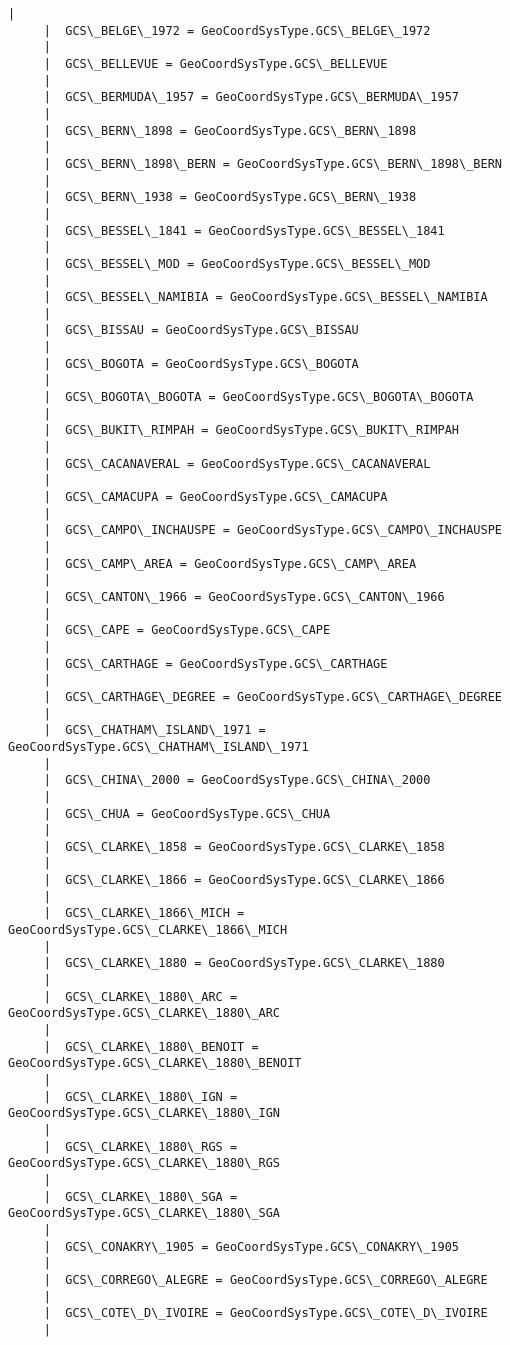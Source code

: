 \documentclass[11pt]{article}
\begin{document}
\begin{Verbatim}[commandchars=\\\{\}]
     |  
     |  GCS\_BELGE\_1972 = GeoCoordSysType.GCS\_BELGE\_1972
     |  
     |  GCS\_BELLEVUE = GeoCoordSysType.GCS\_BELLEVUE
     |  
     |  GCS\_BERMUDA\_1957 = GeoCoordSysType.GCS\_BERMUDA\_1957
     |  
     |  GCS\_BERN\_1898 = GeoCoordSysType.GCS\_BERN\_1898
     |  
     |  GCS\_BERN\_1898\_BERN = GeoCoordSysType.GCS\_BERN\_1898\_BERN
     |  
     |  GCS\_BERN\_1938 = GeoCoordSysType.GCS\_BERN\_1938
     |  
     |  GCS\_BESSEL\_1841 = GeoCoordSysType.GCS\_BESSEL\_1841
     |  
     |  GCS\_BESSEL\_MOD = GeoCoordSysType.GCS\_BESSEL\_MOD
     |  
     |  GCS\_BESSEL\_NAMIBIA = GeoCoordSysType.GCS\_BESSEL\_NAMIBIA
     |  
     |  GCS\_BISSAU = GeoCoordSysType.GCS\_BISSAU
     |  
     |  GCS\_BOGOTA = GeoCoordSysType.GCS\_BOGOTA
     |  
     |  GCS\_BOGOTA\_BOGOTA = GeoCoordSysType.GCS\_BOGOTA\_BOGOTA
     |  
     |  GCS\_BUKIT\_RIMPAH = GeoCoordSysType.GCS\_BUKIT\_RIMPAH
     |  
     |  GCS\_CACANAVERAL = GeoCoordSysType.GCS\_CACANAVERAL
     |  
     |  GCS\_CAMACUPA = GeoCoordSysType.GCS\_CAMACUPA
     |  
     |  GCS\_CAMPO\_INCHAUSPE = GeoCoordSysType.GCS\_CAMPO\_INCHAUSPE
     |  
     |  GCS\_CAMP\_AREA = GeoCoordSysType.GCS\_CAMP\_AREA
     |  
     |  GCS\_CANTON\_1966 = GeoCoordSysType.GCS\_CANTON\_1966
     |  
     |  GCS\_CAPE = GeoCoordSysType.GCS\_CAPE
     |  
     |  GCS\_CARTHAGE = GeoCoordSysType.GCS\_CARTHAGE
     |  
     |  GCS\_CARTHAGE\_DEGREE = GeoCoordSysType.GCS\_CARTHAGE\_DEGREE
     |  
     |  GCS\_CHATHAM\_ISLAND\_1971 = GeoCoordSysType.GCS\_CHATHAM\_ISLAND\_1971
     |  
     |  GCS\_CHINA\_2000 = GeoCoordSysType.GCS\_CHINA\_2000
     |  
     |  GCS\_CHUA = GeoCoordSysType.GCS\_CHUA
     |  
     |  GCS\_CLARKE\_1858 = GeoCoordSysType.GCS\_CLARKE\_1858
     |  
     |  GCS\_CLARKE\_1866 = GeoCoordSysType.GCS\_CLARKE\_1866
     |  
     |  GCS\_CLARKE\_1866\_MICH = GeoCoordSysType.GCS\_CLARKE\_1866\_MICH
     |  
     |  GCS\_CLARKE\_1880 = GeoCoordSysType.GCS\_CLARKE\_1880
     |  
     |  GCS\_CLARKE\_1880\_ARC = GeoCoordSysType.GCS\_CLARKE\_1880\_ARC
     |  
     |  GCS\_CLARKE\_1880\_BENOIT = GeoCoordSysType.GCS\_CLARKE\_1880\_BENOIT
     |  
     |  GCS\_CLARKE\_1880\_IGN = GeoCoordSysType.GCS\_CLARKE\_1880\_IGN
     |  
     |  GCS\_CLARKE\_1880\_RGS = GeoCoordSysType.GCS\_CLARKE\_1880\_RGS
     |  
     |  GCS\_CLARKE\_1880\_SGA = GeoCoordSysType.GCS\_CLARKE\_1880\_SGA
     |  
     |  GCS\_CONAKRY\_1905 = GeoCoordSysType.GCS\_CONAKRY\_1905
     |  
     |  GCS\_CORREGO\_ALEGRE = GeoCoordSysType.GCS\_CORREGO\_ALEGRE
     |  
     |  GCS\_COTE\_D\_IVOIRE = GeoCoordSysType.GCS\_COTE\_D\_IVOIRE
     |  

\end{Verbatim}
\end{document}
